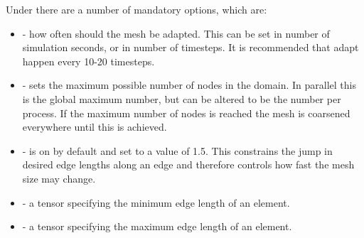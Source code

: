 Under  there are a number of mandatory options, which are:
\begin{itemize}
\item {} - how often should the mesh be adapted. This can be set in number of simulation seconds,
or in number of timesteps. It is recommended that adapt happen every 10-20 timesteps.
\item {} - sets the maximum possible number of nodes in the domain. In parallel this is the
global maximum number, but can be altered to be the number per process. If the maximum number of nodes is reached the mesh is coarsened everywhere until this is achieved.
\item {} - is on by default and set to a value of 1.5. This constrains the jump in desired edge lengths along an edge and therefore controls how fast the mesh size may change.
\item {} - a tensor specifying the minimum edge length of an element.
\item {} - a tensor specifying the maximum edge length of an element.
\end{itemize}


